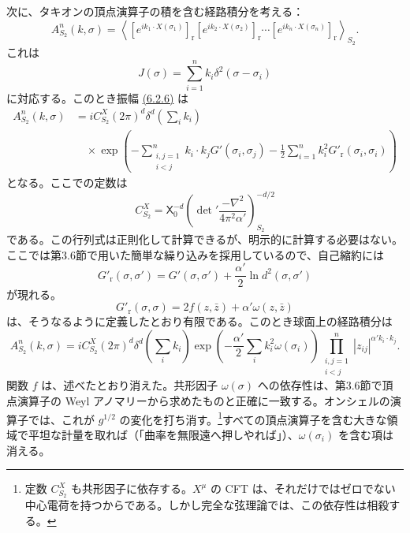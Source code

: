 次に、タキオンの頂点演算子の積を含む経路積分を考える：
\begin{equation}
A_{S_2}^n(k,\sigma)=\left\langle
\left[e^{ik_1\cdot X(\sigma_1)}\right]_{\mathrm r}
\left[e^{ik_2\cdot X(\sigma_2)}\right]_{\mathrm r}\cdots
\left[e^{ik_n\cdot X(\sigma_n)}\right]_{\mathrm r}
\right\rangle_{S_2}.
\tag{6.2.11}\label{eq:6.2.11}
\end{equation}
これは
\begin{equation}
J(\sigma)=\sum_{i=1}^n k_i\delta^2(\sigma-\sigma_i)
\tag{6.2.12}\label{eq:6.2.12}
\end{equation}
に対応する。このとき振幅 \hyperref[eq:6.2.6]{(6.2.6)} は
\begin{equation}
\begin{aligned}
A_{S_2}^n(k,\sigma)&=iC_{S_2}^X(2\pi)^d\delta^d\!\left(\sum_i k_i\right)\\
&\quad\times\exp\left(-\sum_{\substack{i,j=1\\i<j}}^n
k_i\cdot k_jG'(\sigma_i,\sigma_j)
-\frac12\sum_{i=1}^n k_i^2G'_{\mathrm r}(\sigma_i,\sigma_i)\right)
\end{aligned}
\tag{6.2.13}\label{eq:6.2.13}
\end{equation}
となる。ここでの定数は
\begin{equation}
C_{S_2}^X=\mathsf X_0^{-d}
\left(\det{}'\frac{-\nabla^2}{4\pi^2\alpha'}\right)_{S_2}^{-d/2}
\tag{6.2.14}\label{eq:6.2.14}
\end{equation}
である。この行列式は正則化して計算できるが、明示的に計算する必要はない。ここでは第3.6節で用いた簡単な繰り込みを採用しているので、自己縮約には
\begin{equation}
G'_{\mathrm r}(\sigma,\sigma')=G'(\sigma,\sigma')+\frac{\alpha'}2\ln d^2(\sigma,\sigma')
\tag{6.2.15}\label{eq:6.2.15}
\end{equation}
が現れる。
\begin{equation}
G'_{\mathrm r}(\sigma,\sigma)=2f(z,\bar z)+\alpha'\omega(z,\bar z)
\tag{6.2.16}\label{eq:6.2.16}
\end{equation}
は、そうなるように定義したとおり有限である。このとき球面上の経路積分は
\begin{equation}
A_{S_2}^n(k,\sigma)=iC_{S_2}^X(2\pi)^d\delta^d\!\left(\sum_i k_i\right)
\exp\left(-\frac{\alpha'}2\sum_i k_i^2\omega(\sigma_i)\right)
\prod_{\substack{i,j=1\\i<j}}^n|z_{ij}|^{\alpha'k_i\cdot k_j}.
\tag{6.2.17}\label{eq:6.2.17}
\end{equation}
関数 $f$ は、述べたとおり消えた。共形因子 $\omega(\sigma)$ への依存性は、第3.6節で頂点演算子の Weyl アノマリーから求めたものと正確に一致する。オンシェルの演算子では、これが $g^{1/2}$ の変化を打ち消す。\footnote[2]{定数 $C_{S_2}^X$ も共形因子に依存する。$X^\mu$ の CFT は、それだけではゼロでない中心電荷を持つからである。しかし完全な弦理論では、この依存性は相殺する。}すべての頂点演算子を含む大きな領域で平坦な計量を取れば（「曲率を無限遠へ押しやれば」）、$\omega(\sigma_i)$ を含む項は消える。

